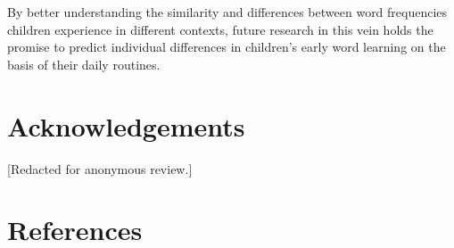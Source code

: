 \documentclass[10pt, letterpaper]{article}
\begin{document}
By better understanding the similarity and differences between word
frequencies children experience in different contexts, future research
in this vein holds the promise to predict individual differences in
children's early word learning on the basis of their daily routines.

\hypertarget{acknowledgements}{%
\section{Acknowledgements}\label{acknowledgements}}

{[}Redacted for anonymous review.{]}

\hypertarget{references}{%
\section{References}\label{references}}

\setlength{\parindent}{-0.1in} 
\setlength{\leftskip}{0.125in}

\noindent
\end{document}
